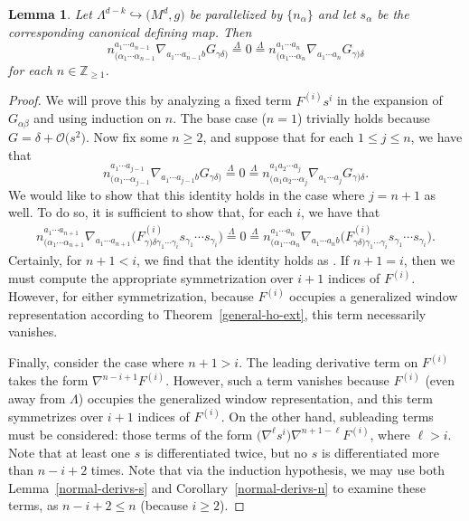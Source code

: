 \documentclass[pdftex]{sigma}
\numberwithin{equation}{section}
\newtheorem{Lemma}[Theorem]{Lemma}
\renewcommand{\=}{\stackrel \Lambda =}
\begin{document}
\begin{Lemma} \label{symmetric-deriv-G}
Let $\Lambda^{d-k} \hookrightarrow \bigl(M^d,g\bigr)$ be parallelized by $\{n_{\alpha}\}$ and let $s_{\alpha}$ be the corresponding canonical defining map.
Then
\[n^{a_1 \cdots a_{n-1}}_{(\alpha_1 \cdots \alpha_{n-1}} \nabla_{a_1 \cdots a_{n-1} b} G_{\gamma \delta)} \= 0 \= n^{a_1 \cdots a_n}_{(\alpha_1 \cdots \alpha_n} \nabla_{a_1 \cdots a_n} G_{\gamma) \delta} \]
for each $n \in \mathbb{Z}_{\geq 1}$.
\end{Lemma}
\begin{proof}
We will prove this by analyzing a fixed term $F^{(i)}s^i$ in the expansion of $G_{\alpha \beta}$ and using induction on $n$. The base case ($n=1$) trivially holds because $G = \delta + \mathcal{O}\bigl(s^2\bigr)$. Now fix some $n \geq 2$, and suppose that for each $1 \leq j \leq n$, we have that
\[n^{a_1 \cdots a_{j-1}}_{(\alpha_1 \cdots \alpha_{j-1}} \nabla_{a_1 \cdots a_{j-1} b} G_{\gamma \delta)} \= 0 \= n^{a_1 a_2 \cdots a_j}_{(\alpha_1 \alpha_2 \cdots \alpha_j} \nabla_{a_1 \cdots a_j} G_{\gamma) \delta} .\]
We would like to show that this identity holds in the case where $j=n+1$ as well. To do so, it is sufficient to show that, for each $i$, we have that
\begin{align} \label{decomp-window}
n^{a_1 \cdots a_{n+1}}_{(\alpha_1 \cdots \alpha_{n+1}} \nabla_{a_1 \cdots a_{n+1}} \bigl(F^{(i)}_{\gamma) \delta \gamma_1 \cdots \gamma_i} s_{\gamma_1} \cdots s_{\gamma_i}\bigr) \= 0 \= n^{a_1 \cdots a_{n}}_{(\alpha_1 \cdots \alpha_{n}} \nabla_{a_1 \cdots a_{n} b} \bigl(F^{(i)}_{\gamma \delta) \gamma_1 \cdots \gamma_i} s_{\gamma_1} \cdots s_{\gamma_i}\bigr) .\!
\end{align}
Certainly, for $n+1 < i$, we find that the identity holds as \smash{$\nabla^{n+1} s^i \= 0$}. If $n+1 = i$, then we must compute the appropriate symmetrization over $i+1$ indices of $F^{(i)}$. However, for either symmetrization, because $F^{(i)}$ occupies a generalized window representation according to Theorem~\ref{general-ho-ext}, this term necessarily vanishes.

Finally, consider the case where $n+1 > i$. The leading derivative term on $F^{(i)}$ takes the form $\nabla^{n-i+1} F^{(i)}$. However, such a term vanishes because $F^{(i)}$ (even away from $\Lambda$) occupies the generalized window representation, and this term symmetrizes over $i+1$ indices of $F^{(i)}$. On the other hand, subleading terms must be considered: those terms of the form $\bigl(\nabla^{\ell} s^i\bigr) \nabla^{n+1-\ell} F^{(i)}$, where $\ell > i$. Note that at least one $s$ is differentiated twice, but no $s$ is differentiated more than $n-i+2$ times. Note that via the induction hypothesis, we may use both Lemma~\ref{normal-derivs-s} and Corollary~\ref{normal-derivs-n} to examine these terms, as $n-i+2 \leq n$ (because $i \geq 2$).


\end{proof}
\end{document}
